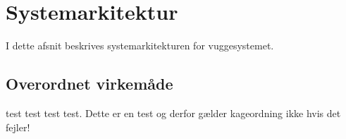 \section{Systemarkitektur}

I dette afsnit beskrives systemarkitekturen for vuggesystemet.

\subsection*{Overordnet virkemåde}


test test test test. Dette er en test og derfor gælder kageordning ikke hvis det fejler!
